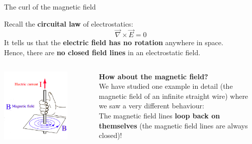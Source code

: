 \begin{frame}{The curl of the magnetic field}

Recall the {\bf circuital law} of electrostatics:
\begin{equation*}
    \vec{\nabla} \times \vec{E} = 0
\end{equation*}
It tells us that the {\bf electric field has no rotation} anywhere in space.\\
Hence, there are {\bf no closed field lines} in an electrostatic field.\\

\vspace{0.2cm}

\begin{columns}
  \begin{column}{0.50\textwidth}
    \includegraphics[width=0.75\textwidth]{./images/schematics/magnetic_field_around_wire_01.png}
  \end{column}
  \begin{column}{0.50\textwidth}
         {\bf How about the magnetic field?}\\
         \vspace{0.2cm}
         We have studied one example in detail (the magnetic field
         of an infinite straight wire) where we saw a very different
         behaviour:\\
         \vspace{0.2cm}
         The magnetic field lines {\bf loop back on themselves} (the magnetic
         field lines are always closed)!
  \end{column}
\end{columns}

\end{frame}

